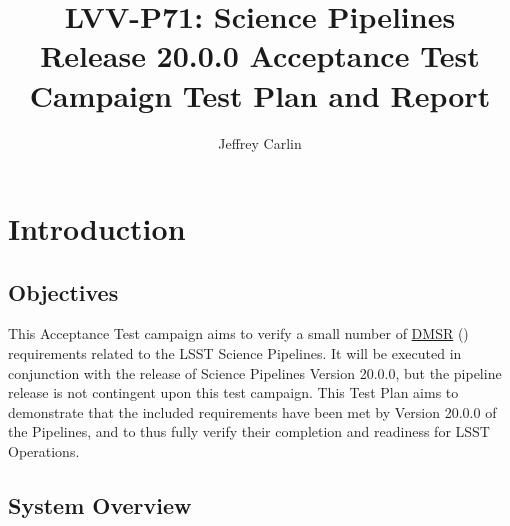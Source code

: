 \documentclass[DM,lsstdraft,STR,toc]{lsstdoc}
\begin{document}
\def\milestoneName{Science Pipelines Release 20.0.0 Acceptance Test Campaign}
\def\milestoneId{LVV-P71}
\def\product{Acceptance}


\title{LVV-P71: Science Pipelines Release 20.0.0 Acceptance Test Campaign Test Plan and Report}
\setDocRef{\lsstDocType-\lsstDocNum}
\date{\vcsdate}
\author{ Jeffrey Carlin }






\maketitle

\section{Introduction}
\label{sect:intro}


\subsection{Objectives}
\label{sect:objectives}

 This Acceptance Test campaign aims to verify a small number of
\href{https://lse-61.lsst.io/}{DMSR} () requirements related to
the LSST Science Pipelines. It will be executed in conjunction with the
release of Science Pipelines Version 20.0.0, but the pipeline release is
not contingent upon this test campaign. This Test Plan aims to
demonstrate that the included requirements have been met by Version
20.0.0 of the Pipelines, and to thus fully verify their completion and
readiness for LSST Operations.



\subsection{System Overview}
\label{sect:systemoverview}
\end{document}
